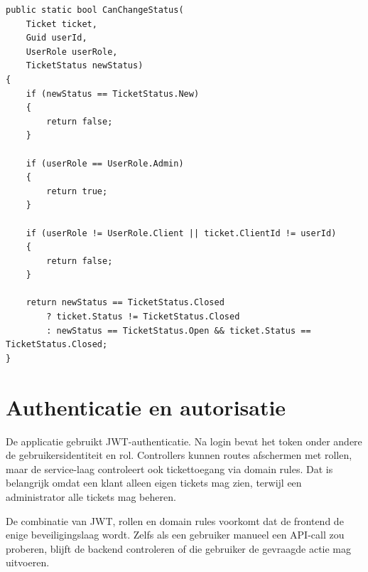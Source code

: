 \begin{listing}[htbp]
\begin{verbatim}
public static bool CanChangeStatus(
    Ticket ticket,
    Guid userId,
    UserRole userRole,
    TicketStatus newStatus)
{
    if (newStatus == TicketStatus.New)
    {
        return false;
    }

    if (userRole == UserRole.Admin)
    {
        return true;
    }

    if (userRole != UserRole.Client || ticket.ClientId != userId)
    {
        return false;
    }

    return newStatus == TicketStatus.Closed
        ? ticket.Status != TicketStatus.Closed
        : newStatus == TicketStatus.Open && ticket.Status == TicketStatus.Closed;
}
\end{verbatim}
\caption[Statuscontrole in TicketRules]{Statuscontrole in \texttt{TicketRules}.}
\label{lst:ticket-rules-status}
\end{listing}

\section{Authenticatie en autorisatie}

De applicatie gebruikt JWT-authenticatie. Na login bevat het token onder andere de gebruikersidentiteit en rol. Controllers kunnen routes afschermen met rollen, maar de service-laag controleert ook tickettoegang via domain rules. Dat is belangrijk omdat een klant alleen eigen tickets mag zien, terwijl een administrator alle tickets mag beheren.

De combinatie van JWT, rollen en domain rules voorkomt dat de frontend de enige beveiligingslaag wordt. Zelfs als een gebruiker manueel een API-call zou proberen, blijft de backend controleren of die gebruiker de gevraagde actie mag uitvoeren.
